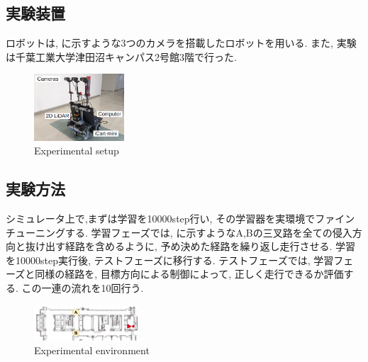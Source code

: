 \documentclass[10pt]{jarticle}
\begin{document}
    \subsection{実験装置}
    ロボットは, に示すような3つのカメラを搭載したロボットを用いる. また, 実験は千葉工業大学津田沼キャンパス2号館3階で行った.
    \begin{center}
        \begin{figure}[h]
            \centering
            \includegraphics[width=0.30\textwidth]{./fig/gamma3.png}
            \caption{Experimental setup}
            \label{fig:gamma}
        \end{figure}
    \end{center}
    \vspace{-1.0cm}

    \subsection{実験方法}
    シミュレータ上で,まずは学習を10000step行い, その学習器を実環境でファインチューニングする. 学習フェーズでは, に示すようなA,Bの三叉路を全ての侵入方向と抜け出す経路を含めるように, 予め決めた経路を繰り返し走行させる. 学習を10000step実行後, テストフェーズに移行する. テストフェーズでは, 学習フェーズと同様の経路を, 目標方向による制御によって, 正しく走行できるか評価する. この一連の流れを10回行う.
    \begin{center}
        \begin{figure}[h]
            \centering
            \includegraphics[width=0.35\textwidth]{./fig/tsudanuma2.png}
            \caption{Experimental environment}
            \label{fig:tsudanuma}
        \end{figure}
    \end{center}



    
\end{document}
